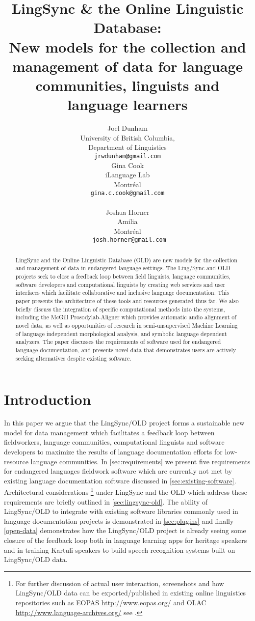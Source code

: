 \documentclass[11pt]{article}
\title{LingSync \& the Online Linguistic Database:\\New models for the
    collection and management of data for language communities, linguists and
language learners}
\author{Joel Dunham \\
University of British Columbia,   \\
Department of Linguistics \\
{\tt jrwdunham@gmail.com} \\\And
Gina Cook \\
iLanguage Lab \\
Montr\'eal \\
{\tt gina.c.cook@gmail.com} \\  \\\And
Joshua Horner \\
Amilia  \\
Montr\'eal \\
{\tt ~josh.horner@gmail.com} \\ }
\date{}
\begin{document}
\maketitle

\begin{abstract}
LingSync and the Online Linguistic Database (OLD) are new models for the
collection and management of data in endangered language settings. The
Ling\-/Sync and OLD projects seek to close a feedback loop  between field
linguists, language communities, software developers and computational
linguists  by creating web services and user interfaces which facilitate
collaborative and inclusive language documentation. This paper presents the
architecture of these tools and resources generated thus far. We also briefly discuss the
integration of specific computational methods into the systems, including the
McGill Prosodylab-Aligner which provides automatic audio alignment of novel
data, as well as opportunities of research in semi-unsupervised Machine
Learning of  language independent morphological analysis, and symbolic language
dependent analyzers.  The paper discusses the requirements of software used for endangered language
documentation, and presents novel data that demonstrates users are actively seeking alternatives despite existing software.
\end{abstract}


\section{Introduction}

In this paper we argue that the LingSync/OLD project forms a sustainable new
model for data management which facilitates a feedback loop between fieldworkers, language communities, computational linguists and software developers
to maximize the results of language documentation efforts for low-resource
language communities. In \autoref{sec:requirements} we present five
requirements for endangered languages fieldwork software  which
are currently not met by existing language documentation software discussed in
\autoref{sec:existing-software}. Architectural considerations%
\footnote{For further discussion of actual user interaction, screenshots and
    how LingSync/OLD data can be exported/published in existing online
    linguistics repositories such as EOPAS \url{http://www.eopas.org/} and OLAC
    \url{http://www.language-archives.org/} see \cite{lingsync:2012}.} %
under LingSync and the OLD which address these requirements are briefly
outlined in \autoref{sec:lingsync-old}.  The ability of LingSync/OLD to
integrate with existing software libraries commonly used in language
documentation projects is demonstrated in \autoref{sec:plugins} and finally
\autoref{open-data} demonstrates how the LingSync/OLD project is already
seeing some closure of the feedback loop both in language learning apps for
heritage speakers and in training Kartuli speakers to build speech recognition
systems built on LingSync/OLD data.  
\end{document}
